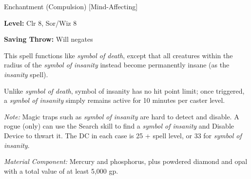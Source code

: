 
Enchantment (Compulsion) [Mind-Affecting]

\textbf{Level:} Clr 8, Sor/Wiz 8

\textbf{Saving Throw:} Will negates

This spell functions like \textit{symbol of death}, except that all creatures within 
the radius of the \textit{symbol of insanity} instead become permanently insane 
(as the \textit{insanity} spell).

Unlike \textit{symbol of death}, symbol of insanity has no hit point limit; once 
triggered, a \textit{symbol of insanity} simply remains active for 10 minutes per 
caster level.

\textit{Note:} Magic traps such as \textit{symbol of insanity} are hard to detect 
and disable. A rogue (only) can use the Search skill to find a \textit{symbol of 
insanity} and Disable Device to thwart it. The DC in each case is 25 + spell level, 
or 33 for \textit{symbol of insanity}.

\textit{Material Component:} Mercury and phosphorus, plus powdered diamond and 
opal with a total value of at least 5,000 gp.

